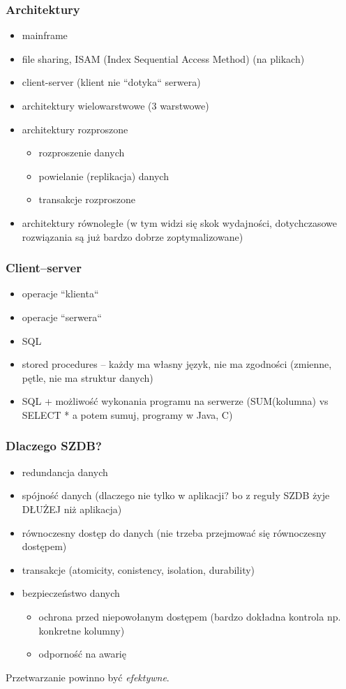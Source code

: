 \documentclass[12pt]{article}
\begin{document}
\subsubsection{Architektury}
\begin{itemize}
\item  mainframe
\item  file sharing, ISAM (Index Sequential Access Method) (na plikach)
\item  client-server (klient nie ``dotyka`` serwera)
\item  architektury wielowarstwowe (3 warstwowe)
\item  architektury rozproszone
\begin{itemize}
\item  rozproszenie danych
\item powielanie (replikacja) danych
\item transakcje rozproszone
\end{itemize}
\item  architektury równoległe (w tym widzi się skok wydajności, dotychczasowe rozwiązania są już
   bardzo dobrze zoptymalizowane)
\end{itemize}

\subsubsection{Client--server}
\begin{itemize}
\item operacje ``klienta``
\item operacje ``serwera``
\item SQL
\item stored procedures -- każdy ma własny język, nie ma zgodności (zmienne, pętle, nie ma struktur danych)
\item SQL + możliwość wykonania programu na serwerze (SUM(kolumna) vs SELECT * a potem sumuj, programy w Java, C)
\end{itemize}

\subsubsection{Dlaczego SZDB?}
\begin{itemize}
\item redundancja danych
\item spójność danych (dlaczego nie tylko w aplikacji? bo z reguły SZDB żyje DŁUŻEJ niż aplikacja)
\item równoczesny dostęp do danych (nie trzeba przejmować się równoczesny dostępem)
\item transakcje (atomicity, conistency, isolation, durability)
\item bezpieczeństwo danych
\begin{itemize}
\item ochrona przed niepowołanym dostępem (bardzo dokładna kontrola np. konkretne kolumny)
\item odporność na awarię
\end{itemize}
\end{itemize}
Przetwarzanie powinno być \emph{efektywne}.
\end{document}
